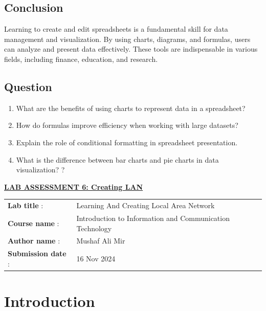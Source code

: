 \documentclass[a4paper,9pt]{article}
\begin{document}
\subsection{Conclusion}
Learning to create and edit spreadsheets is a fundamental skill for data management and visualization. By using charts, diagrams, and formulas, users can analyze and present data effectively. These tools are indispensable in various fields, including finance, education, and research.

\subsection{Question}

\begin{enumerate}
	\item What are the benefits of using charts to represent data in a spreadsheet?
	
	\item How do formulas improve efficiency when working with large datasets?
	\item Explain the role of conditional formatting in spreadsheet presentation.
	\item What is the difference between bar charts and pie charts in data visualization?
	?
	
\end{enumerate}

\newpage


\begin{center}
	{\Huge \bfseries \underline{ LAB ASSESSMENT 6: Creating LAN } \par}
\end{center}
\noindent\begin{tabular}{@{}ll}
	\textbf{Lab title} :&Learning And Creating Local Area Network \\
	\textbf{Course name} :&  Introduction to Information and Communication Technology\\
	\textbf{Author name} : & Mushaf Ali Mir\\
	\textbf{Submission date} :& 16 Nov 2024 \\
\end{tabular}

\section*{Introduction}
\setcounter{section}{6}
\setcounter{figure}{0}  %
\setcounter{subsection}{0}
\end{document}

